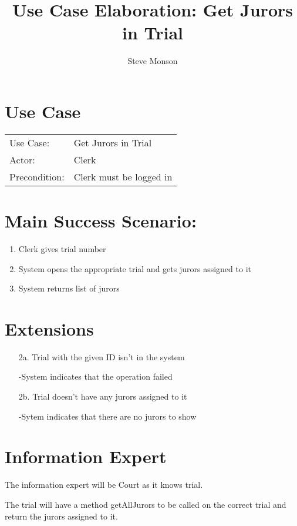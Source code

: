 \documentclass{article}
\title{Use Case Elaboration: Get Jurors in Trial}
\author{Steve Monson}
\begin{document}
\maketitle

\section*{Use Case}
\begin{tabular}{l l}
  Use Case:     & Get Jurors in Trial\\
  Actor:        & Clerk\\
  Precondition: & Clerk must be logged in\\
\end{tabular}

\section*{Main Success Scenario:}
\begin{enumerate}
  \item Clerk gives trial number
  \item System opens the appropriate trial and gets jurors assigned to it
  \item System returns list of jurors
\end{enumerate}

\section*{Extensions}
\begin{itemize}
    \item [2a.] Trial with the given ID isn't in the system

    -System indicates that the operation failed
    
  \item [2b.] Trial doesn't have any jurors assigned to it
  
    -Sytem indicates that there are no jurors to show

\end{itemize}

\section*{Information Expert}

The information expert will be Court as it knows trial.

The trial will have a method getAllJurors to be called on the correct trial and return the jurors assigned to it. 
\end{document}
